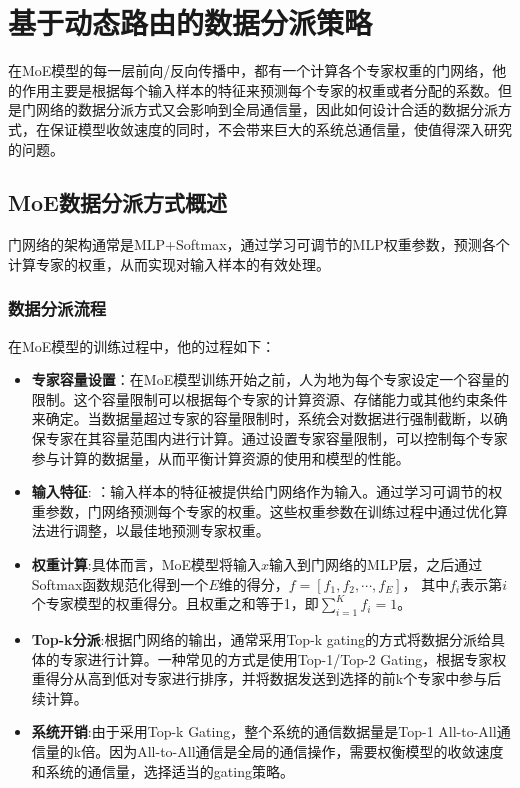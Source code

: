 \chapter{基于动态路由的数据分派策略}

在MoE模型的每一层前向/反向传播中，都有一个计算各个专家权重的门网络，他的作用主要是根据每个输入样本的特征来预测每个专家的权重或者分配的系数。但是门网络的数据分派方式又会影响到全局通信量，因此如何设计合适的数据分派方式，在保证模型收敛速度的同时，不会带来巨大的系统总通信量，使值得深入研究的问题。

\section{MoE数据分派方式概述}

门网络的架构通常是MLP+Softmax，通过学习可调节的MLP权重参数，预测各个计算专家的权重，从而实现对输入样本的有效处理。

\subsection{数据分派流程}

在MoE模型的训练过程中，他的过程如下：

\begin{itemize}
    \item \textbf{专家容量设置}：在MoE模型训练开始之前，人为地为每个专家设定一个容量的限制。这个容量限制可以根据每个专家的计算资源、存储能力或其他约束条件来确定。当数据量超过专家的容量限制时，系统会对数据进行强制截断，以确保专家在其容量范围内进行计算。通过设置专家容量限制，可以控制每个专家参与计算的数据量，从而平衡计算资源的使用和模型的性能。
    \item \textbf{输入特征}: ：输入样本的特征被提供给门网络作为输入。通过学习可调节的权重参数，门网络预测每个专家的权重。这些权重参数在训练过程中通过优化算法进行调整，以最佳地预测专家权重。
    \item \textbf{权重计算}:具体而言，MoE模型将输入$x$输入到门网络的MLP层，之后通过Softmax函数规范化得到一个$E$维的得分，$f=[f_1,f_2,\cdots,f_E]$， 其中$f_i$表示第$i$个专家模型的权重得分。且权重之和等于1，即$\sum_{i=1}^K f_i = 1$。
    \item \textbf{Top-k分派}:根据门网络的输出，通常采用Top-k gating的方式将数据分派给具体的专家进行计算。一种常见的方式是使用Top-1/Top-2 Gating，根据专家权重得分从高到低对专家进行排序，并将数据发送到选择的前k个专家中参与后续计算。
    \item \textbf{系统开销}:由于采用Top-k Gating，整个系统的通信数据量是Top-1 All-to-All通信量的k倍。因为All-to-All通信是全局的通信操作，需要权衡模型的收敛速度和系统的通信量，选择适当的gating策略。
\end{itemize}

